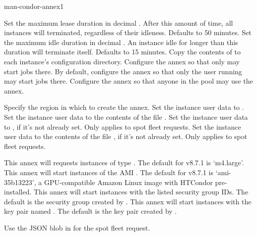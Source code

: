 \begin{ManPage}{}{man-condor-annex}{1}
\begin{Options}
		{Set the maximum lease duration in decimal .  After this amount of time, all instances will terminated, regardless of their idleness.  Defaults to 50 minutes.}
		{Set the maximum idle duration in decimal .  An instance idle for longer than this duration will terminate itself.  Defaults to 15 minutes.}
		{Copy the contents of  to each instance's configuration directory.}
		{Configure the annex so that only  may start jobs there.  By default, configure the annex so that only the user running  may start jobs there.}
		{Configure the annex so that anyone in the pool may use the annex.}

		{Specify the region in which to create the annex.}
		{Set the instance user data to .}
		{Set the instance user data to the contents of the file .}
		{Set the instance user data to , if it's not already set.  Only applies to spot fleet requests.}
		{Set the instance user data to the contents of the file , if it's not already set.  Only applies to spot fleet requests.}

		{This annex will requests instances of type .  The default for v8.7.1 is `m4.large'.}
		{This annex will start instances of the AMI .  The default for v8.7.1 is `ami-35b13223', a GPU-compatible Amazon Linux image with HTCondor pre-installed.}
		{This annex will start instances with the listed security group IDs.  The default is the security group created by .}
		{This annex will start instances with the key pair named .  The default is the key pair created by .}

		{Use the JSON blob in  for the spot fleet request.}


\end{Options}
\end{ManPage}
